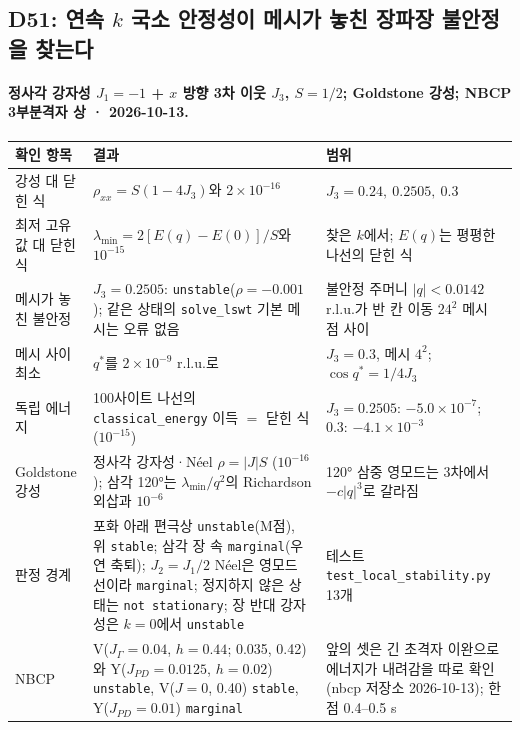 \subsection{D51: 연속 $k$ 국소 안정성이 메시가 놓친 장파장 불안정을 찾는다}\label{d51-local-stability}
\begingroup%
  \framesubtitle{정사각 강자성 $J_1=-1$ + $x$ 방향 3차 이웃 $J_3$, $S=1/2$; Goldstone 강성; NBCP 3부분격자 상 · 2026-10-13.}
  \footnotesize\renewcommand{\arraystretch}{1.08}
  \begin{tabularx}{\textwidth}{@{}P{3.3cm}P{3.4cm}Y@{}}
    \toprule
    확인 항목 & 결과 & 범위 \\
    \midrule
    강성 대 닫힌 식 & $\rho_{xx}=S(1-4J_3)$와 $2\times10^{-16}$ & $J_3=0.24,\ 0.2505,\ 0.3$ \\
    최저 고유값 대 닫힌 식 & $\lambda_{\min}=2[E(q)-E(0)]/S$와 $10^{-15}$ & 찾은 $k$에서; $E(q)$는 평평한 나선의 닫힌 식 \\
    메시가 놓친 불안정 & $J_3=0.2505$: \texttt{unstable}($\rho=-0.001$); 같은 상태의 \texttt{solve\_lswt} 기본 메시는 오류 없음 & 불안정 주머니 $|q|<0.0142$ r.l.u.가 반 칸 이동 $24^2$ 메시 점 사이 \\
    메시 사이 최소 & $q^*$를 $2\times10^{-9}$ r.l.u.로 & $J_3=0.3$, 메시 $4^2$; $\cos q^*=1/4J_3$ \\
    독립 에너지 & 100사이트 나선의 \texttt{classical\_energy} 이득 $=$ 닫힌 식($10^{-15}$) & $J_3=0.2505$: $-5.0\times10^{-7}$; 0.3: $-4.1\times10^{-3}$ \\
    Goldstone 강성 & 정사각 강자성·Néel $\rho=|J|S$ ($10^{-16}$); 삼각 120°는 $\lambda_{\min}/q^2$의 Richardson 외삽과 $10^{-6}$ & 120° 삼중 영모드는 3차에서 $-c|q|^3$로 갈라짐 \\
    판정 경계 & 포화 아래 편극상 \texttt{unstable}(M점), 위 \texttt{stable}; 삼각 장 속 \texttt{marginal}(우연 축퇴); $J_2=J_1/2$ Néel은 영모드 선이라 \texttt{marginal}; 정지하지 않은 상태는 \texttt{not stationary}; 장 반대 강자성은 $k=0$에서 \texttt{unstable} & 테스트 \texttt{test\_local\_stability.py} 13개 \\
    NBCP & V($J_\Gamma=0.04$, $h=0.44$; 0.035, 0.42)와 Y($J_{PD}=0.0125$, $h=0.02$) \texttt{unstable}, V($J=0$, 0.40) \texttt{stable}, Y($J_{PD}=0.01$) \texttt{marginal} & 앞의 셋은 긴 초격자 이완으로 에너지가 내려감을 따로 확인(nbcp 저장소 2026-10-13); 한 점 0.4--0.5 s \\
    \bottomrule
  \end{tabularx}
  \par\medskip
\endgroup


